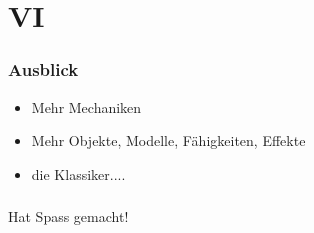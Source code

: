 ﻿\documentclass{beamer}
\begin{document}
\section{VI}
\begin{frame} %
  \frametitle{Ausblick} %
  \begin{itemize}
			\item Mehr Mechaniken
			\item Mehr Objekte, Modelle, Fähigkeiten, Effekte
			\item die Klassiker....
		\end{itemize}
\end{frame}


\begin{frame} %
  \frametitle{} %
  \LARGE Hat Spass gemacht!
\end{frame}
\end{document}
